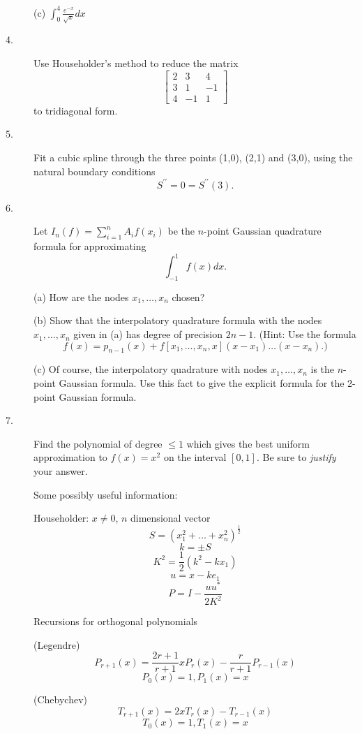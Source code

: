\documentclass{article}
\begin{document}
\begin{description}
\item[\quad] (c)
$\int^4_0 \frac{e^{-x}}{\sqrt{x}} dx$

\item[4.]
Use Householder's method to reduce the matrix
$$\left[\begin{array}{ccc}
        2&3&4 \\
        3&1&-1 \\
        4&-1&1
        \end{array}
        \right]$$
to tridiagonal form.

\item[5.]
Fit a cubic spline through the three points (1,0), (2,1) and (3,0), using
the natural boundary conditions
$$S^{\prime \prime} = 0 = S^{\prime \prime} (3).$$

\item[6.]
Let $I_n (f) = \sum^n_{i=1} A_i f(x_i)$ be the $n$-point Gaussian quadrature
formula for approximating
$$\int^1_{-1} f(x) dx.$$

\item[\quad] (a)
How are the nodes $x_1, \dots, x_n$ chosen?

\item[\quad] (b)
Show that the interpolatory quadrature formula with the nodes
$x_1, \dots, x_n$ given in (a) has degree of precision $2n-1$. (Hint: Use
the formula
$$f(x) = p_{n-1} (x) + f[x_1, \dots, x_n, x] (x-x_1) \dots (x-x_n).)$$

\item[\quad] (c)
Of course, the interpolatory quadrature  with nodes $x_1, \dots, x_n$ is
the $n$-point Gaussian formula. Use this fact to give the explicit formula
for the 2-point Gaussian formula.

\item[7.]
Find the polynomial of degree $\leq 1$ which gives the best uniform
approximation to $f(x) = x^2$ on the interval $[0,1]$. Be sure to
{\it justify} your answer.

\vspace{.5in}

Some possibly useful information:

Householder: $x \neq 0$, $n$ dimensional vector
$$S= \left(x^2_1 + \dots + x^2_n \right)^{\frac{1}{2}}$$
$$k= \pm S$$
$$K^2 = \frac{1}{2} (k^2 - kx_1)$$
$$u=x-ke_1$$
$$P=I - \frac{uu^*}{2K^2}$$

Recursions for orthogonal polynomials

(Legendre)
$$P_{r+1} (x) = \frac{2r+1}{r+1} xP_r(x) - \frac{r}{r+1} P_{r-1} (x)$$
$$P_0 (x) = 1, P_1 (x) = x$$

(Chebychev)
$$T_{r+1} (x) = 2x T_r (x) - T_{r-1} (x)$$
$$T_0 (x) = 1, T_1 (x) = x$$







\end{description}    
\end{document}
